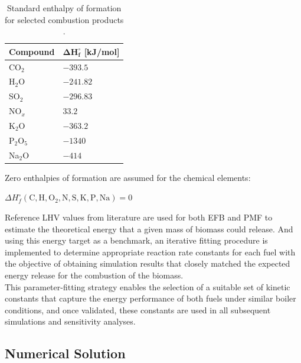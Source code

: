 \documentclass[preprint,12pt]{elsarticle}
\begin{document}
\begin{table}[H]
\begin{center}
\caption{Standard enthalpy of formation for selected combustion products \cite{AtkinsPChem}.}
\label{tabla:entalpias_formacion}
\begin{tabular*}{6cm}{l p{3cm}} \hline
\textbf{Compound} & $\boldsymbol{\Delta H_f^\circ}$ \textbf{[kJ/mol]} \\ \hline
CO$_2$           & $-393.5$ \\
H$_2$O           & $-241.82$ \\
SO$_2$           & $-296.83$ \\
NO$_x$           & $33.2$ \\
K$_2$O           & $-363.2$ \\
P$_2$O$_5$       & $-1340$ \\
Na$_2$O          & $-414$ \\ \hline
\end{tabular*}
\end{center}
\end{table}

Zero enthalpies of formation are assumed for the chemical elements:
\begin{center}
$\Delta H_f^{\circ}(\text{C}, \text{H}, \text{O}_2, \text{N}, \text{S}, \text{K}, \text{P}, \text{Na}) = 0$
\end{center}

Reference LHV values from literature are used for both EFB and PMF to estimate the theoretical energy that a given mass of biomass could release. And using this energy target as a benchmark, an iterative fitting procedure is implemented to determine appropriate reaction rate constants for each fuel with the objective of obtaining simulation results that closely matched the expected energy release for the combustion of the biomass.\\

This parameter-fitting strategy enables the selection of a suitable set of kinetic constants that capture the energy performance of both fuels under similar boiler conditions, and once validated, these constants are used in all subsequent simulations and sensitivity analyses.\\

\subsection{Numerical Solution}\\
\end{document}
